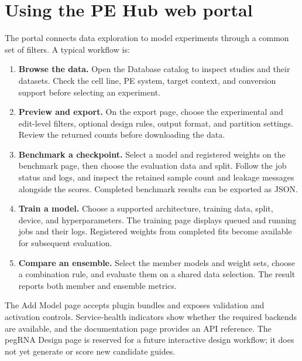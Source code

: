 \documentclass{article}
\begin{document}
\section{Using the PE Hub web portal}
\label{app:web-portal}

The portal connects data exploration to model experiments through a common set of filters. A typical workflow is:

\begin{enumerate}
    \item \textbf{Browse the data.} Open the Database catalog to inspect studies and their datasets. Check the cell line, PE system, target context, and conversion support before selecting an experiment.
    \item \textbf{Preview and export.} On the export page, choose the experimental and edit-level filters, optional design rules, output format, and partition settings. Review the returned counts before downloading the data.
    \item \textbf{Benchmark a checkpoint.} Select a model and registered weights on the benchmark page, then choose the evaluation data and split. Follow the job status and logs, and inspect the retained sample count and leakage messages alongside the scores. Completed benchmark results can be exported as JSON.
    \item \textbf{Train a model.} Choose a supported architecture, training data, split, device, and hyperparameters. The training page displays queued and running jobs and their logs. Registered weights from completed fits become available for subsequent evaluation.
    \item \textbf{Compare an ensemble.} Select the member models and weight sets, choose a combination rule, and evaluate them on a shared data selection. The result reports both member and ensemble metrics.
\end{enumerate}

The Add Model page accepts plugin bundles and exposes validation and activation controls. Service-health indicators show whether the required backends are available, and the documentation page provides an API reference. The pegRNA Design page is reserved for a future interactive design workflow; it does not yet generate or score new candidate guides.
\end{document}
